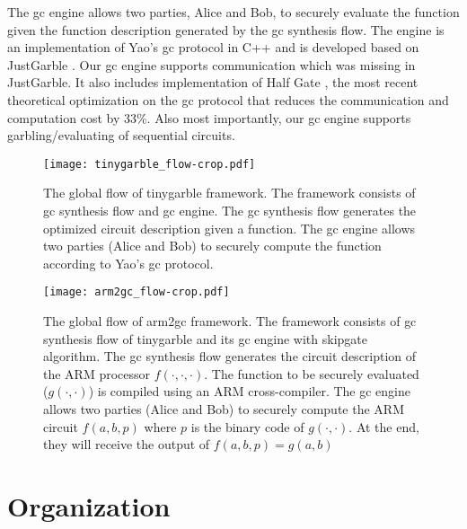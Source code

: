 The \acrshort{gc} engine allows two parties, Alice and Bob, to securely evaluate the function given the function description generated by the \acrshort{gc} synthesis flow.
The engine is an implementation of Yao's \acrshort{gc} protocol in C++ and is developed based on JustGarble \cite{bellare2013efficient}.
Our \acrshort{gc} engine supports communication which was missing in JustGarble.
It also includes implementation of Half Gate \cite{zahur2015two}, the most recent theoretical optimization on the \acrshort{gc} protocol that reduces the communication and computation cost by 33\%.
Also most importantly, our \acrshort{gc} engine supports garbling/evaluating of sequential circuits.

\begin{figure}
\centering
\texttt{[image: tinygarble\_flow-crop.pdf]}
\caption{The global flow of \gls{tinygarble} framework.
The framework consists of \acrshort{gc} synthesis flow and \acrshort{gc} engine.
The \acrshort{gc} synthesis flow generates the optimized circuit description given a function.
The \acrshort{gc} engine allows two parties (Alice and Bob) to securely compute the function according to Yao's \acrshort{gc} protocol.
}
\label{fig:globalflow}
\end{figure}

\begin{figure}
\centering
\texttt{[image: arm2gc\_flow-crop.pdf]}
\caption{The global flow of \gls{arm2gc} framework.
The framework consists of \acrshort{gc} synthesis flow of \gls{tinygarble} and its \acrshort{gc} engine with \gls{skipgate} algorithm.
The \acrshort{gc} synthesis flow generates the circuit description of the ARM processor $f(\cdot,\cdot,\cdot)$.
The function to be securely evaluated ($g(\cdot,\cdot)$) is compiled using an ARM cross-compiler.
The \acrshort{gc} engine allows two parties (Alice and Bob) to securely compute the ARM circuit $f(a,b,p)$ where $p$ is the binary code of $g(\cdot,\cdot)$.
At the end, they will receive the output of $f(a,b,p) = g(a,b)$
}
\label{fig:arm2gc-globalflow}
\end{figure}


\section{Organization}
